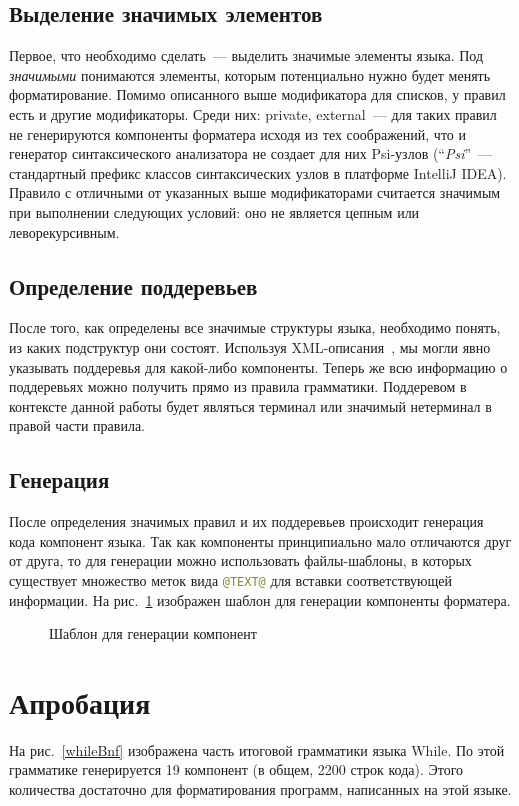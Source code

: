\documentclass[conference]{IEEEtran}
\begin{document}
\subsection{Выделение значимых элементов}
Первое, что необходимо сделать~--- выделить значимые элементы языка. 
Под \emph{значимыми} понимаются элементы, которым потенциально нужно будет менять форматирование.
Помимо описанного выше модификатора для списков, у правил есть и другие модификаторы.
Среди них: private, external~--- для таких правил не генерируются компоненты форматера исходя из тех соображений, что и генератор синтаксического анализатора не создает для них Psi-узлов (``\emph{Psi}''~--- стандартный префикс классов синтаксических узлов в платформе IntelliJ IDEA).
Правило с отличными от указанных выше модификаторами считается значимым при выполнении следующих условий: оно не является цепным или леворекурсивным.

\subsection{Определение поддеревьев}
После того, как определены все значимые структуры языка, необходимо понять, из каких подструктур они состоят.
Используя XML-описания~\cite{while}, мы могли явно указывать поддеревья для какой-либо компоненты.
Теперь же всю информацию о поддеревьях можно получить прямо из правила грамматики.
Поддеревом в контексте данной работы будет являться терминал или значимый нетерминал в правой части правила.

\subsection{Генерация}
После определения значимых правил и их поддеревьев происходит генерация кода компонент языка.
Так как компоненты принципиально мало отличаются друг от друга, то для генерации можно использовать файлы-шаблоны, в которых существует множество меток вида \lstinline[language=java]{@TEXT@} для вставки соответствующей информации.
На рис.~\ref{component} изображен шаблон для генерации компоненты форматера.
\begin{figure}[h]
	\centering
	
	\caption{Шаблон для генерации компонент}
	\label{component}
\end{figure}

\section{Апробация}
На рис.~\ref{whileBnf} изображена часть итоговой грамматики языка While.
По этой грамматике генерируется 19 компонент (в общем, 2200 строк кода).
Этого количества достаточно для форматирования программ, написанных на этой языке.
\end{document}
